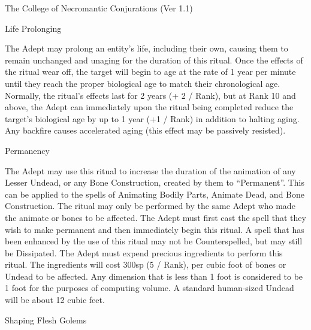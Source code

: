 \begin{Chapter}{The College of Necromantic Conjurations (Ver 1.1)}
\begin{ritual}[R-2]{Life Prolonging}

\begin{effects}
The Adept may prolong an entity’s life, including their own, causing
them to remain unchanged and unaging for the duration of this ritual.
Once the effects of the ritual wear off, the target will begin to age
at the rate of 1 year per minute until they reach the proper
biological age to match their chronological age.  Normally, the
ritual’s effects last for 2 years (+ 2 / Rank), but at Rank 10 and
above, the Adept can immediately upon the ritual being completed
reduce the target’s biological age by up to 1 year (+1 / Rank) in
addition to halting aging.  Any backfire causes accelerated aging
(this effect may be passively resisted).
\end{effects}
\end{ritual}

\begin{ritual}[R-3]{Permanency}

\begin{effects}
The Adept may use this ritual to increase the duration of the
animation of any Lesser Undead, or any Bone Construction, created by
them to “Permanent”.  This can be applied to the spells of Animating
Bodily Parts, Animate Dead, and Bone Construction. The ritual may only
be performed by the same Adept who made the animate or bones to be
affected. The Adept must first cast the spell that they wish to make
permanent and then immediately begin this ritual.  A spell that has
been enhanced by the use of this ritual may not be Counterspelled,
but may still be Dissipated.  The Adept must expend precious
ingredients to perform this ritual.  The ingredients will cost 300sp
(5 / Rank), per cubic foot of bones or Undead to be affected.  Any
dimension that is less than 1 foot is considered to be 1 foot for the
purposes of computing volume.  A standard human-sized Undead will be
about 12 cubic feet.
\end{effects}
\end{ritual}

\begin{ritual}[R-4]{Shaping Flesh Golems}


\end{ritual}
\end{Chapter}
